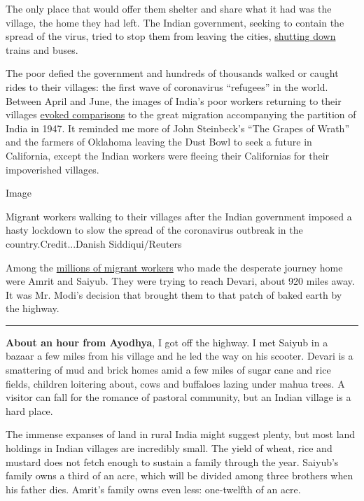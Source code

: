 The only place that would offer them shelter and share what it had was
the village, the home they had left. The Indian government, seeking to
contain the spread of the virus, tried to stop them from leaving the
cities,
\href{https://www.ndtv.com/india-news/coronavirus-trains-stopped-till-march-31-no-metros-interstate-buses-to-prevent-spread-of-coronavirus-2198784}{shutting
down} trains and buses.

The poor defied the government and hundreds of thousands walked or
caught rides to their villages: the first wave of coronavirus
``refugees'' in the world. Between April and June, the images of India's
poor workers returning to their villages
\href{https://www.theguardian.com/world/2020/mar/30/india-wracked-by-greatest-exodus-since-partition-due-to-coronavirus}{evoked
comparisons} to the great migration accompanying the partition of India
in 1947. It reminded me more of John Steinbeck's ``The Grapes of Wrath''
and the farmers of Oklahoma leaving the Dust Bowl to seek a future in
California, except the Indian workers were fleeing their Californias for
their impoverished villages.

Image

Migrant workers walking to their villages after the Indian government
imposed a hasty lockdown to slow the spread of the coronavirus outbreak
in the country.Credit...Danish Siddiqui/Reuters

Among the
\href{https://indianexpress.com/article/explained/coronavirus-how-many-migrant-workers-displaced-a-range-of-estimates-6447840/}{millions
of migrant workers} who made the desperate journey home were Amrit and
Saiyub. They were trying to reach Devari, about 920 miles away. It was
Mr. Modi's decision that brought them to that patch of baked earth by
the highway.

\begin{center}\rule{0.5\linewidth}{\linethickness}\end{center}

\textbf{About an hour from Ayodhya}, I got off the highway. I met Saiyub
in a bazaar a few miles from his village and he led the way on his
scooter. Devari is a smattering of mud and brick homes amid a few miles
of sugar cane and rice fields, children loitering about, cows and
buffaloes lazing under mahua trees. A visitor can fall for the romance
of pastoral community, but an Indian village is a hard place.

The immense expanses of land in rural India might suggest plenty, but
most land holdings in Indian villages are incredibly small. The yield of
wheat, rice and mustard does not fetch enough to sustain a family
through the year. Saiyub's family owns a third of an acre, which will be
divided among three brothers when his father dies. Amrit's family owns
even less: one-twelfth of an acre.

